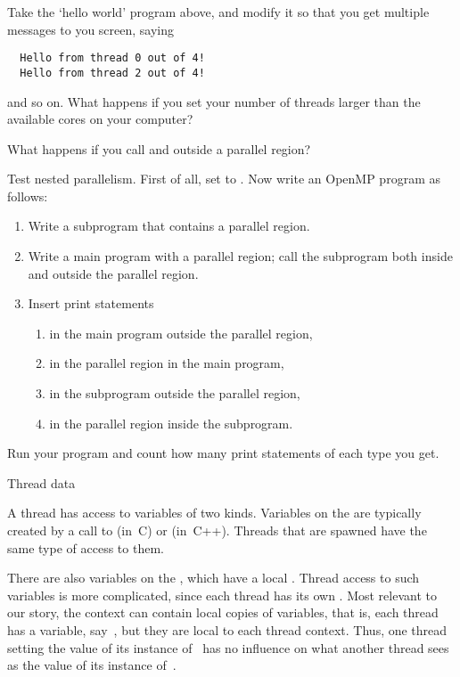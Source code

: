 \begin{exercise}
  Take the `hello world' program above, and modify it so that you get
  multiple messages to you screen, saying
\begin{verbatim}
  Hello from thread 0 out of 4!
  Hello from thread 2 out of 4!
\end{verbatim}
  and so on. What happens if you set your number of threads larger than the available
  cores on your computer?
\end{exercise}

\begin{exercise}
  What happens if you call  and 
  outside a parallel region?
\end{exercise}

\begin{exercise}
  Test nested parallelism. First of all, set  to
  . Now write an OpenMP program as follows:
  \begin{enumerate}
  \item Write a subprogram that contains a parallel region.
  \item Write a main program with a parallel region; call the subprogram both inside and outside the parallel region.
    \item Insert print statements 
      \begin{enumerate}
      \item in the main program outside the parallel region,
      \item in the parallel region in the main program,
      \item in the subprogram outside the parallel region,
      \item in the parallel region inside the subprogram.
      \end{enumerate}
  \end{enumerate}
  Run your program and count how many print statements of each type you get.
\end{exercise}

 {Thread data}

A thread has access to variables of two kinds. Variables on the
 are typically created by a call to 
(in~C) or  (in~C++). Threads that are spawned have
the same type of access to them.

There are also variables on the , which have a local
. Thread access to such variables is more complicated,
since each thread has its own . Most relevant to our story,
the context can contain local copies of variables, that is, each thread
has a variable, say~, but they are local to each thread context.
Thus, one thread setting the value of its instance of~ has no influence on what
another thread sees as the value of its instance of~.

